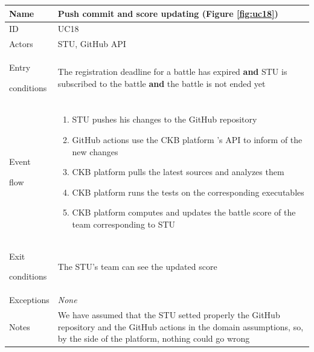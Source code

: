 \begin{center}
    \def\arraystretch{1.5}
    \begin{tabular}{| m{2cm} | m{10cm}|}
        \hline
        Name                  & Push commit and score updating (Figure \ref{fig:uc18})                                                                                                                       \\ \hline
        ID                    & UC18                                                                                                                                                                         \\ \hline
        Actors                & STU, GitHub API                                                                                                                                                              \\ \hline
        Entry \par conditions & The registration deadline for a battle has expired \textbf{and} STU is subscribed to the battle \textbf{and} the battle is not ended yet                                     \\ \hline
        Event \par flow       & \begin{enumerate}
                                    \item STU pushes his changes to the GitHub repository
                                    \item GitHub actions use the CKB platform 's API to inform of the new changes
                                    \item CKB platform pulls the latest sources and analyzes them
                                    \item CKB platform runs the tests on the corresponding executables
                                    \item CKB platform computes and updates the battle score of the team corresponding to STU
                                \end{enumerate}                                                                                     \\ \hline
        Exit \par conditions  & The STU's team can see the updated score                                                                                                                                     \\ \hline
        Exceptions            & \textit{None}                                                                                                                                                                \\ \hline
        Notes                 & We have assumed that the STU setted properly the GitHub repository and the GitHub actions in the domain assumptions, so, by the side of the platform, nothing could go wrong \\ \hline
    \end{tabular}
\end{center}

